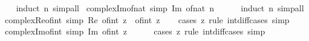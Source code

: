 \begin{isabellebody}
%
\isadelimproof
\ \ %
\endisadelimproof
%
\isatagproof
{}\isamarkupfalse%
\ {\isacharparenleft}{\kern0pt}induct\ n{\isacharparenright}{\kern0pt}\ simp{\isacharunderscore}{\kern0pt}all%
\endisatagproof
{\isafoldproof}%
%
\isadelimproof
\isanewline
%
\endisadelimproof
\isanewline
{}\isamarkupfalse%
\ complex{\isacharunderscore}{\kern0pt}Im{\isacharunderscore}{\kern0pt}of{\isacharunderscore}{\kern0pt}nat\ {\isacharbrackleft}{\kern0pt}simp{\isacharbrackright}{\kern0pt}{\isacharcolon}{\kern0pt}\ {\isachardoublequoteopen}Im\ {\isacharparenleft}{\kern0pt}of{\isacharunderscore}{\kern0pt}nat\ n{\isacharparenright}{\kern0pt}\ {\isacharequal}{\kern0pt}\ {}{\isachardoublequoteclose}\isanewline
%
\isadelimproof
\ \ %
\endisadelimproof
%
\isatagproof
{}\isamarkupfalse%
\ {\isacharparenleft}{\kern0pt}induct\ n{\isacharparenright}{\kern0pt}\ simp{\isacharunderscore}{\kern0pt}all%
\endisatagproof
{\isafoldproof}%
%
\isadelimproof
\isanewline
%
\endisadelimproof
\isanewline
{}\isamarkupfalse%
\ complex{\isacharunderscore}{\kern0pt}Re{\isacharunderscore}{\kern0pt}of{\isacharunderscore}{\kern0pt}int\ {\isacharbrackleft}{\kern0pt}simp{\isacharbrackright}{\kern0pt}{\isacharcolon}{\kern0pt}\ {\isachardoublequoteopen}Re\ {\isacharparenleft}{\kern0pt}of{\isacharunderscore}{\kern0pt}int\ z{\isacharparenright}{\kern0pt}\ {\isacharequal}{\kern0pt}\ of{\isacharunderscore}{\kern0pt}int\ z{\isachardoublequoteclose}\isanewline
%
\isadelimproof
\ \ %
\endisadelimproof
%
\isatagproof
{}\isamarkupfalse%
\ {\isacharparenleft}{\kern0pt}cases\ z\ rule{\isacharcolon}{\kern0pt}\ int{\isacharunderscore}{\kern0pt}diff{\isacharunderscore}{\kern0pt}cases{\isacharparenright}{\kern0pt}\ simp%
\endisatagproof
{\isafoldproof}%
%
\isadelimproof
\isanewline
%
\endisadelimproof
\isanewline
{}\isamarkupfalse%
\ complex{\isacharunderscore}{\kern0pt}Im{\isacharunderscore}{\kern0pt}of{\isacharunderscore}{\kern0pt}int\ {\isacharbrackleft}{\kern0pt}simp{\isacharbrackright}{\kern0pt}{\isacharcolon}{\kern0pt}\ {\isachardoublequoteopen}Im\ {\isacharparenleft}{\kern0pt}of{\isacharunderscore}{\kern0pt}int\ z{\isacharparenright}{\kern0pt}\ {\isacharequal}{\kern0pt}\ {}{\isachardoublequoteclose}\isanewline
%
\isadelimproof
\ \ %
\endisadelimproof
%
\isatagproof
{}\isamarkupfalse%
\ {\isacharparenleft}{\kern0pt}cases\ z\ rule{\isacharcolon}{\kern0pt}\ int{\isacharunderscore}{\kern0pt}diff{\isacharunderscore}{\kern0pt}cases{\isacharparenright}{\kern0pt}\ simp%
\endisatagproof
{\isafoldproof}%
%
\isadelimproof

\end{isabellebody}
